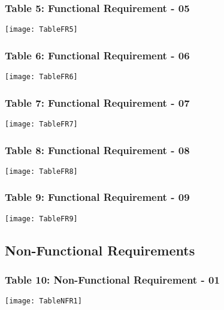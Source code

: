\begin{figure}[ht]
\subsubsection{Table 5: Functional Requirement - 05}
\centering
\texttt{[image: TableFR5]}
\end{figure}

\begin{figure}[ht]
\subsubsection{Table 6: Functional Requirement - 06}
\centering
\texttt{[image: TableFR6]}
\end{figure}

\begin{figure}[ht]
\subsubsection{Table 7: Functional Requirement - 07}
\centering
\texttt{[image: TableFR7]}
\end{figure}

\begin{figure}[ht]
\subsubsection{Table 8: Functional Requirement - 08}
\centering
\texttt{[image: TableFR8]}
\end{figure}

\begin{figure}[ht]
\subsubsection{Table 9: Functional Requirement - 09}
\centering
\texttt{[image: TableFR9]}
\end{figure}

\begin{figure}[ht]
\subsection{Non-Functional Requirements} 

\subsubsection{Table 10: Non-Functional Requirement - 01}
\centering
\texttt{[image: TableNFR1]}
\end{figure}

